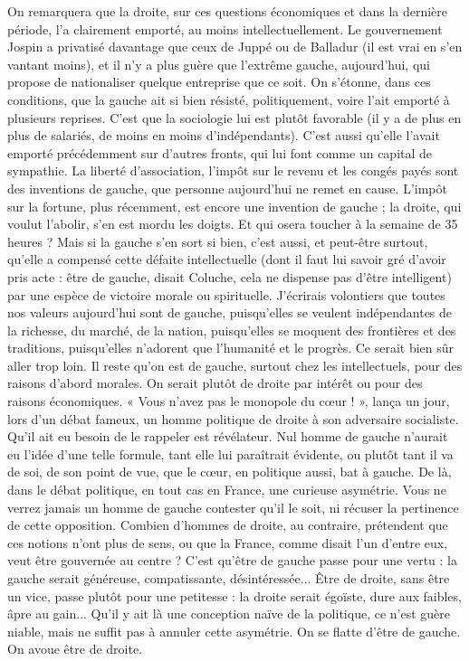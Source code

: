 On remarquera que la droite, sur ces questions économiques et dans la dernière
période, l’a clairement emporté, au moins intellectuellement. Le gouvernement
Jospin a privatisé davantage que ceux de Juppé ou de Balladur (il est
vrai en s’en vantant moins), et il n’y a plus guère que l’extrême gauche,
aujourd’hui, qui propose de nationaliser quelque entreprise que ce soit. On
s'étonne, dans ces conditions, que la gauche ait si bien résisté, politiquement,
voire l’ait emporté à plusieurs reprises. C’est que la sociologie lui est plutôt
favorable (il y a de plus en plus de salariés, de moins en moins
d’indépendants). C’est aussi qu’elle l'avait emporté précédemment sur d’autres
fronts, qui lui font comme un capital de sympathie. La liberté d’association,
l'impôt sur le revenu et les congés payés sont des inventions de gauche, que
personne aujourd’hui ne remet en cause. L’impôt sur la fortune, plus récemment,
est encore une invention de gauche ; la droite, qui voulut l'abolir, s’en
est mordu les doigts. Et qui osera toucher à la semaine de 35 heures ? Mais si
la gauche s’en sort si bien, c’est aussi, et peut-être surtout, qu’elle a compensé
cette défaite intellectuelle (dont il faut lui savoir gré d’avoir pris acte : être de
gauche, disait Coluche, cela ne dispense pas d’être intelligent) par une espèce
de victoire morale ou spirituelle. J’écrirais volontiers que toutes nos valeurs
aujourd’hui sont de gauche, puisqu'elles se veulent indépendantes de la
richesse, du marché, de la nation, puisqu'elles se moquent des frontières et des
traditions, puisqu'elles n’adorent que l'humanité et le progrès. Ce serait bien
sûr aller trop loin. Il reste qu’on est de gauche, surtout chez les intellectuels,
pour des raisons d’abord morales. On serait plutôt de droite par intérêt ou pour
des raisons économiques. « Vous n’avez pas le monopole du cœur ! », lança un
jour, lors d’un débat fameux, un homme politique de droite à son adversaire
socialiste. Qu'il ait eu besoin de le rappeler est révélateur. Nul homme de
gauche n’aurait eu l’idée d’une telle formule, tant elle lui paraîtrait évidente, ou
plutôt tant il va de soi, de son point de vue, que le cœur, en politique aussi, bat
à gauche. De là, dans le débat politique, en tout cas en France, une curieuse
asymétrie. Vous ne verrez jamais un homme de gauche contester qu’il le soit,
ni récuser la pertinence de cette opposition. Combien d'hommes de droite, au
contraire, prétendent que ces notions n’ont plus de sens, ou que la France,
comme disait l’un d’entre eux, veut être gouvernée au centre ? C’est qu'être de
gauche passe pour une vertu : la gauche serait généreuse, compatissante, désintéressée...
Être de droite, sans être un vice, passe plutôt pour une petitesse : la
droite serait égoïste, dure aux faibles, âpre au gain... Qu'il y ait là une conception
naïve de la politique, ce n’est guère niable, mais ne suffit pas à annuler
cette asymétrie. On se flatte d’être de gauche. On avoue être de droite.

